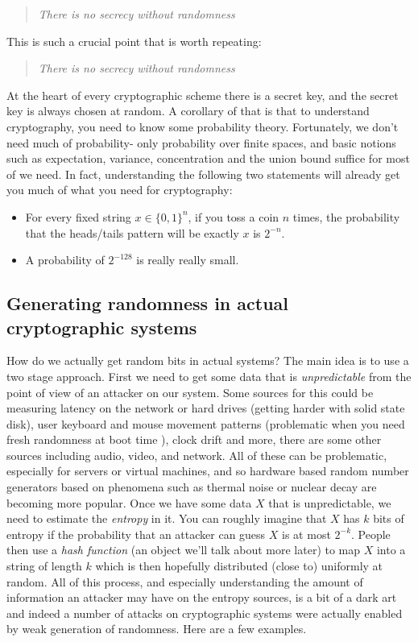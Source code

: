 \begin{quote}
\emph{There is no secrecy without randomness}
\end{quote}

This is such a crucial point that is worth repeating:

\begin{quote}
\emph{There is no secrecy without randomness}
\end{quote}

At the heart of every cryptographic scheme there is a secret key, and
the secret key is always chosen at random. A corollary of that is that
to understand cryptography, you need to know some probability theory.
Fortunately, we don't need much of probability- only probability over
finite spaces, and basic notions such as expectation, variance,
concentration and the union bound suffice for most of we need. In fact,
understanding the following two statements will already get you much of
what you need for cryptography:

\begin{itemize}
\item
  For every fixed string \(x\in\{0,1\}^n\), if you toss a coin \(n\)
  times, the probability that the heads/tails pattern will be exactly
  \(x\) is \(2^{-n}\).
\item
  A probability of \(2^{-128}\) is really really small.
\end{itemize}

\subsection{Generating randomness in actual cryptographic
systems}\label{1-Generating-randomness-}

How do we actually get random bits in actual systems? The main idea is
to use a two stage approach. First we need to get some data that is
\emph{unpredictable} from the point of view of an attacker on our
system. Some sources for this could be measuring latency on the network
or hard drives (getting harder with solid state disk), user keyboard and
mouse movement patterns (problematic when you need fresh randomness at
boot time ), clock drift and more, there are some other sources
including audio, video, and network. All of these can be problematic,
especially for servers or virtual machines, and so hardware based random
number generators based on phenomena such as thermal noise or nuclear
decay are becoming more popular. Once we have some data \(X\) that is
unpredictable, we need to estimate the \emph{entropy} in it. You can
roughly imagine that \(X\) has \(k\) bits of entropy if the probability
that an attacker can guess \(X\) is at most \(2^{-k}\). People then use
a \emph{hash function} (an object we'll talk about more later) to map
\(X\) into a string of length \(k\) which is then hopefully distributed
(close to) uniformly at random. All of this process, and especially
understanding the amount of information an attacker may have on the
entropy sources, is a bit of a dark art and indeed a number of attacks
on cryptographic systems were actually enabled by weak generation of
randomness. Here are a few examples.

